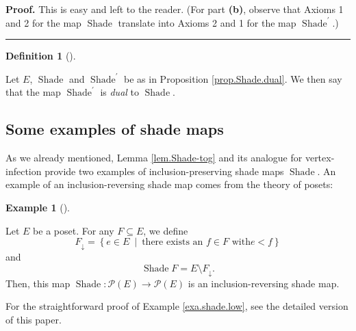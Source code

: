 \documentclass[numbers=enddot,12pt,final,onecolumn]{scrartcl}%
\theoremstyle{definition}
\newtheorem{defi}[theo]{Definition}
\newenvironment{definition}[1][]
{\begin{defi}[#1]\begin{leftbar}}
{\end{leftbar}\end{defi}}
\newtheorem{exam}[theo]{Example}
\newenvironment{example}[1][]
{\begin{exam}[#1]\begin{leftbar}}
{\end{leftbar}\end{exam}}
\newenvironment{proof}[1][Proof]{\noindent\textbf{#1.} }{\ \rule{0.5em}{0.5em}}
\newenvironment{vershort}{}{}
\begin{document}
\begin{proof}
This is easy and left to the reader. (For part \textbf{(b)}, observe that
Axioms 1 and 2 for the map $\operatorname*{Shade}$ translate into Axioms 2 and
1 for the map $\operatorname*{Shade}\nolimits^{\prime}$.)
\end{proof}

\begin{definition}
Let $E$, $\operatorname*{Shade}$ and $\operatorname*{Shade}\nolimits^{\prime}$
be as in Proposition \ref{prop.Shade.dual}. We then say that the map
$\operatorname*{Shade}\nolimits^{\prime}$ is \emph{dual} to
$\operatorname*{Shade}$.
\end{definition}

\subsection{Some examples of shade maps}

As we already mentioned, Lemma \ref{lem.Shade-tog} and its analogue for
vertex-infection provide two examples of inclusion-preserving shade maps
$\operatorname*{Shade}$. An example of an inclusion-reversing shade map comes
from the theory of posets:

\begin{example}
\label{exa.shade.low}Let $E$ be a poset. For any $F\subseteq E$, we define%
\[
F_{\downarrow}=\left\{  e\in E\ \mid\ \text{there exists an }f\in F\text{ with
}e<f\right\}
\]
and%
\[
\operatorname*{Shade}F=E\setminus F_{\downarrow}.
\]
Then, this map $\operatorname*{Shade}:\mathcal{P}\left(  E\right)
\rightarrow\mathcal{P}\left(  E\right)  $ is an inclusion-reversing shade map.
\end{example}

\begin{vershort}
For the straightforward proof of Example \ref{exa.shade.low}, see the detailed
version \cite{verlong} of this paper.
\end{vershort}
\end{document}
